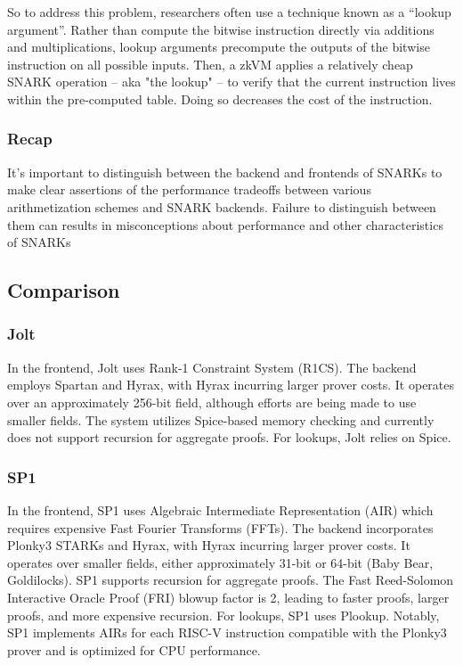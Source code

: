 \documentclass{scrartcl}
\begin{document}
So to address this problem, researchers often use a technique known as a “lookup argument”. Rather than compute the bitwise instruction directly via additions and multiplications, lookup arguments precompute the outputs of the bitwise instruction on all possible inputs. Then, a zkVM applies a relatively cheap SNARK operation – aka "the lookup" – to verify that the current instruction lives within the pre-computed table. Doing so decreases the cost of the instruction.

\subsubsection{Recap}

It’s important to distinguish between the backend and frontends of SNARKs to make clear assertions of the performance tradeoffs between various arithmetization schemes and SNARK backends. Failure to distinguish between them can results in misconceptions about performance and other characteristics of SNARKs

\subsection{Comparison}

\subsubsection{Jolt}
In the frontend, Jolt uses Rank-1 Constraint System (R1CS). The backend employs Spartan and Hyrax, with Hyrax incurring larger prover costs. It operates over an approximately 256-bit field, although efforts are being made to use smaller fields. The system utilizes Spice-based memory checking and currently does not support recursion for aggregate proofs. For lookups, Jolt relies on Spice.

\subsubsection{SP1}
In the frontend, SP1 uses Algebraic Intermediate Representation (AIR) which requires expensive Fast Fourier Transforms (FFTs). The backend incorporates Plonky3 STARKs and Hyrax, with Hyrax incurring larger prover costs. It operates over smaller fields, either approximately 31-bit or 64-bit (Baby Bear, Goldilocks). SP1 supports recursion for aggregate proofs. The Fast Reed-Solomon Interactive Oracle Proof (FRI) blowup factor is 2, leading to faster proofs, larger proofs, and more expensive recursion. For lookups, SP1 uses Plookup. Notably, SP1 implements AIRs for each RISC-V instruction compatible with the Plonky3 prover and is optimized for CPU performance.
\end{document}
